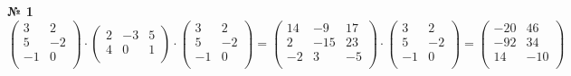 \documentclass[a4paper, 12pt]{article}
\newenvironment{task}[1][0]{\vspace{.5cm} {\textbf{№ #1} \vspace{.5cm}\\ }}{}
\begin{document}
	\begin{task}[1]
$
\begin{pmatrix}
	3 & 2\\
	5 & -2\\
	-1 & 0\\
\end{pmatrix} \cdot
\begin{pmatrix}
	2 & -3 & 5\\
	4 & 0 & 1\\
\end{pmatrix} \cdot
\begin{pmatrix}
	3 & 2\\
	5 & -2\\
	-1 & 0\\
\end{pmatrix}=
\begin{pmatrix}
	14 & -9 & 17\\
	2 & -15 & 23\\
	-2 & 3 & -5\\
\end{pmatrix} \cdot
\begin{pmatrix}
	3 & 2\\
	5 & -2\\
	-1 & 0\\
\end{pmatrix}=
\begin{pmatrix}
	-20 & 46\\
	-92 & 34\\
	14 & -10\\
\end{pmatrix}
$
\end{task}
\end{document}
